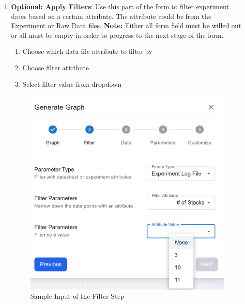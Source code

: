 \documentclass[12pt]{article}
\begin{document}
\begin{enumerate}
    \item \textbf{Optional: Apply Filters}: \newline
    Use this part of the form to filter experiment dates based on a certain
    attribute. The attribute could be from the Experiment or Raw Data files.
    \newline
    \textbf{Note:} Either all form field must be willed out or all must be empty in order
    to progress to the next stage of the form. 
    \begin{enumerate}
        \item Choose which data file attribute to filter by
        \item Choose filter attribute 
        \item Select filter value from dropdown
    \end{enumerate}
    \begin{figure}[H]
        \centering
        \includegraphics[scale=0.4]{Images/graph-filter.png}
        \caption{Sample Input of the Filter Step}
        \label{fig:example}
    \end{figure}


\end{enumerate}
\end{document}
